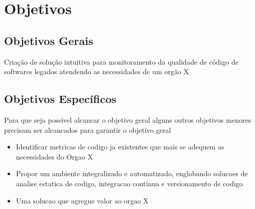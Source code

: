 	

	\section{Objetivos}

	\subsection{Objetivos Gerais} %
	\label{sub:objetivos_gerais}
	
		Criação de solução intuitiva para monitoramento da qualidade de código de softwares legados atendendo as necessidades de um orgão X


	\subsection{Objetivos Específicos} %
	\label{sub:objetivos_específicos}

	Para que seja possivel alcancar o objetivo geral alguns outros objetivos menores precisam ser alcancados para garantir  o objetivo geral 
		 
	\begin{itemize}
		\item Identificar metricas de codigo ja existentes que mais se adequem as necessidades do Orgao X
		\item Propor um ambiente integralizado e automatizado, englobando solucoes de analise estatica de codigo, integracao continua e versionamento de codigo
		\item Uma solucao que agregue valor ao orgao X
	\end{itemize}
	
